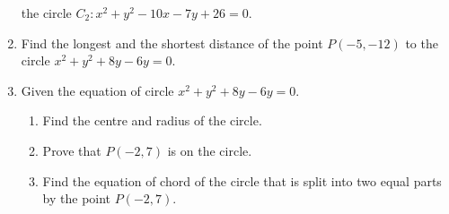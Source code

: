 \documentclass{report}
\begin{document}
\begin{multicols}{2}
\begin{enumerate}
              the circle $C_2: x^2 + y^2 - 10x - 7y + 26 = 0$.
        \item Find the longest and the shortest distance of the point $P(-5, -12)$ to the
              circle $x^2 + y^2 + 8y - 6y = 0$.
        \item Given the equation of circle $x^2 + y^2 + 8y - 6y = 0$.
              \begin{enumerate}
                  \item Find the centre and radius of the circle.
                  \item Prove that $P(-2, 7)$ is on the circle.
                  \item Find the equation of chord of the circle that is split into two equal parts by
                        the point $P(-2, 7)$.
              \end{enumerate}
    \end{enumerate}

\end{multicols}
\end{document}
